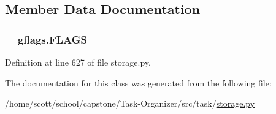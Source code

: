 \subsection{\-Member \-Data \-Documentation}
\hypertarget{classstorage_1_1GTaskStorage_a587a0c1c17188d6b8d7c13866a20ba7c}{
\subsubsection[{\-F\-L\-A\-G\-S}]{ = gflags.\-F\-L\-A\-G\-S}}
\label{classstorage_1_1GTaskStorage_a587a0c1c17188d6b8d7c13866a20ba7c}


\-Definition at line 627 of file storage.\-py.



\-The documentation for this class was generated from the following file\-:\begin{DoxyCompactItemize}
\item 
/home/scott/school/capstone/\-Task-\/\-Organizer/src/task/\hyperlink{storage_8py}{storage.\-py}\end{DoxyCompactItemize}
